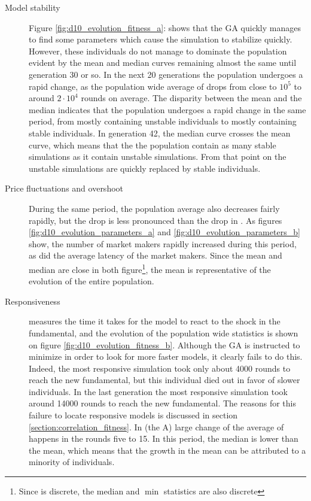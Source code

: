 \begin{description}
\item[Model stability]
Figure \ref{fig:d10_evolution_fitness_a}: shows that  the GA quickly manages to find some parameters which cause the simulation to stabilize quickly. However, these individuals do not manage to dominate the population evident by the mean and median curves remaining almost the same until generation 30 or so. In the next 20 generations the population undergoes a rapid change, as the population wide average of \roundstable{} drops from close to $10^5$ to around $2\cdot 10^4$ rounds on average. The disparity between the mean and the median indicates that the population undergoes a rapid change in the same period, from mostly containing unstable individuals to mostly containing stable individuals. In generation 42, the median curve crosses the mean curve, which means that the the population contain as many stable simulations as it contain unstable simulations. From that point on the unstable simulations are quickly replaced by stable individuals.
\item[Price fluctuations and overshoot]
During the same period, the population average \stdev{} also decreases fairly rapidly, but the drop is less pronounced than the drop in \stdev. As figures \ref{fig:d10_evolution_parameters_a} and \ref{fig:d10_evolution_parameters_b} show, the number of market makers rapidly increased during this period, as did the average latency of the market makers. Since the mean and median are close in both figure\footnote{Since \overshoot{} is discrete, the median and $\min$ statistics are also discrete}, the mean is representative of the evolution of the entire population.
\item[Responsiveness]
\timetoreachnewfundamental{} measures the time it takes for the model to react to the shock in the fundamental, and the evolution of the population wide statistics is shown on figure \ref{fig:d10_evolution_fitness_b}. Although the GA is instructed to minimize \timetoreachnewfundamental{} in order to look for more faster models, it clearly fails to do this. Indeed, the most responsive simulation took only about 4000 rounds to reach the new fundamental, but this individual died out in favor of slower individuals. In the last generation the most responsive simulation took around 14000 rounds to reach the new fundamental. The reasons for this failure to locate responsive models is discussed in section \ref{section:correlation_fitness}. In (the A) large change of the average of \timetoreachnewfundamental{} happens in the rounds five to 15. In this period, the median is lower than the mean, which means that the growth in the mean can be attributed to a minority of individuals.
\end{description}


